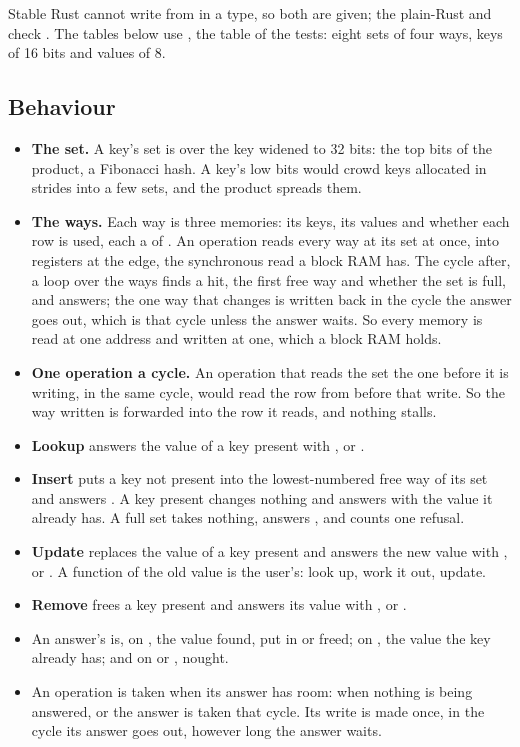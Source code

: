 Stable Rust cannot write  from  in a type, so both are
given; the plain-Rust  and 
check . The tables below use ,
the table of the tests: eight sets of four ways, keys of 16 bits and
values of 8.


\subsection*{Behaviour}

\begin{itemize}
\item \textbf{The set.} A key's set is  over the key widened to 32 bits: the top  bits of the
product, a Fibonacci hash. A key's low bits would crowd keys allocated
in strides into a few sets, and the product spreads them.
\item \textbf{The ways.} Each way is three memories: its keys, its
values and whether each row is used, each a  of .
An operation reads every way at its set at once, into registers at the
edge, the synchronous read a block RAM has. The cycle after, a loop
over the ways finds a hit, the first free way and whether the set is
full, and answers; the one way that changes is written back in the
cycle the answer goes out, which is that cycle unless the answer
waits. So every
memory is read at one address and written at one, which a block RAM
holds.
\item \textbf{One operation a cycle.} An operation that reads the set
the one before it is writing, in the same cycle, would read the row
from before that write. So the way written is forwarded into the row
it reads, and nothing stalls.
\item \textbf{Lookup} answers the value of a key present with
, or .
\item \textbf{Insert} puts a key not present into the lowest-numbered
free way of its set and answers . A key present changes
nothing and answers  with the value it already has. A
full set takes nothing, answers , and counts one refusal.
\item \textbf{Update} replaces the value of a key present and answers
the new value with , or . A function of the old
value is the user's: look up, work it out, update.
\item \textbf{Remove} frees a key present and answers its value with
, or .
\item An answer's  is, on , the value found, put in
or freed; on , the value the key already has; and on
 or , nought.
\item An operation is taken when its answer has room: when nothing is
being answered, or the answer is taken that cycle. Its write is made
once, in the cycle its answer goes out, however long the answer waits.
\end{itemize}

